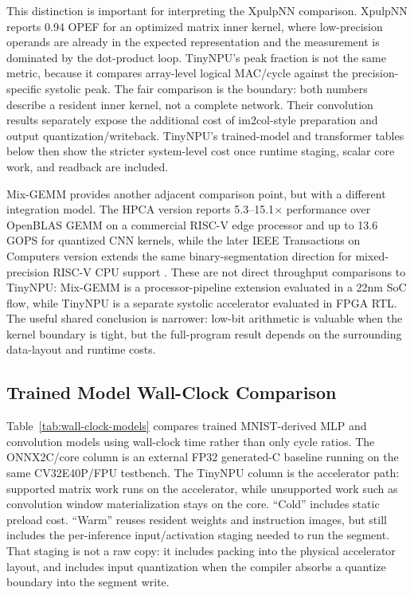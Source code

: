 \documentclass[a4paper, 12pt, titlepage]{article}
\begin{document}
This distinction is important for interpreting the XpulpNN comparison. XpulpNN reports 0.94 OPEF for an optimized matrix inner kernel, where low-precision operands are already in the expected representation and the measurement is dominated by the dot-product loop. TinyNPU's peak fraction is not the same metric, because it compares array-level logical MAC/cycle against the precision-specific systolic peak. The fair comparison is the boundary: both numbers describe a resident inner kernel, not a complete network. Their convolution results separately expose the additional cost of im2col-style preparation and output quantization/writeback. TinyNPU's trained-model and transformer tables below then show the stricter system-level cost once runtime staging, scalar core work, and readback are included.

Mix-GEMM provides another adjacent comparison point, but with a different integration model. The HPCA version reports 5.3--15.1\(\times\) performance over OpenBLAS GEMM on a commercial RISC-V edge processor and up to 13.6 GOPS for quantized CNN kernels, while the later IEEE Transactions on Computers version extends the same binary-segmentation direction for mixed-precision RISC-V CPU support \cite{reggiani2023mixgemm, fornt2025mixgemm}. These are not direct throughput comparisons to TinyNPU: Mix-GEMM is a processor-pipeline extension evaluated in a 22nm SoC flow, while TinyNPU is a separate systolic accelerator evaluated in FPGA RTL. The useful shared conclusion is narrower: low-bit arithmetic is valuable when the kernel boundary is tight, but the full-program result depends on the surrounding data-layout and runtime costs.

\subsection{Trained Model Wall-Clock Comparison}
\label{sec:trained-model-wallclock}

Table~\ref{tab:wall-clock-models} compares trained MNIST-derived MLP and convolution models using wall-clock time rather than only cycle ratios. The ONNX2C/core column is an external FP32 generated-C baseline running on the same CV32E40P/FPU testbench. The TinyNPU column is the accelerator path: supported matrix work runs on the accelerator, while unsupported work such as convolution window materialization stays on the core. ``Cold'' includes static preload cost. ``Warm'' reuses resident weights and instruction images, but still includes the per-inference input/activation staging needed to run the segment. That staging is not a raw copy: it includes packing into the physical accelerator layout, and includes input quantization when the compiler absorbs a quantize boundary into the segment write.
\end{document}
